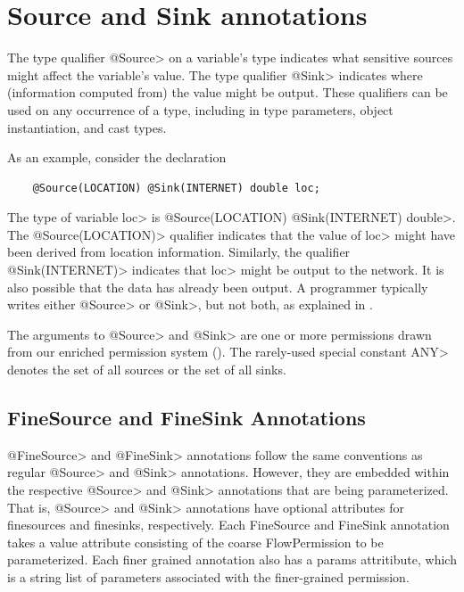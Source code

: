 



\section{Source and Sink annotations\label{sec:flow-type-system}}


The type qualifier \<@Source> on a variable's
type indicates what sensitive sources might affect the variable's value.
The type qualifier \<@Sink> indicates where (information computed from) the
value might be output.
These qualifiers can be used on any occurrence
of a type, including in type parameters, object instantiation, and cast types.


As an example, consider the declaration

\begin{Verbatim}
    @Source(LOCATION) @Sink(INTERNET) double loc;
\end{Verbatim}

\noindent
The type of variable \<loc> is \<@Source(LOCATION) @Sink(INTERNET)
double>.
The \<@Source(LOCATION)> qualifier indicates that the
value of \<loc> might have been derived from
location information.
Similarly, the qualifier \<@Sink(INTERNET)> indicates that
\<loc> might be output to the network.  It is also
possible that the data has already been output.
A programmer typically writes either \<@Source> or \<@Sink>, but not both, as explained
in  . 

The arguments to \<@Source> and \<@Sink> are one or more permissions
drawn from our enriched permission system ().
The rarely-used special constant \<ANY> denotes the set of all sources or the set of all
sinks.

\subsection{FineSource and FineSink Annotations\label{sec:fine-source-and-sink}}
\<@FineSource> and \<@FineSink> annotations follow the same conventions as 
regular \<@Source> and \<@Sink> annotations. However, they are embedded within
the respective \<@Source> and \<@Sink> annotations that are being parameterized.
That is, \<@Source> and \<@Sink> annotations have optional attributes for
finesources and finesinks, respectively. Each FineSource and FineSink annotation
takes a value attribute consisting of the coarse FlowPermission to be parameterized.
Each finer grained annotation also has a params attritibute, which is a
string list of parameters associated with the finer-grained permission.

